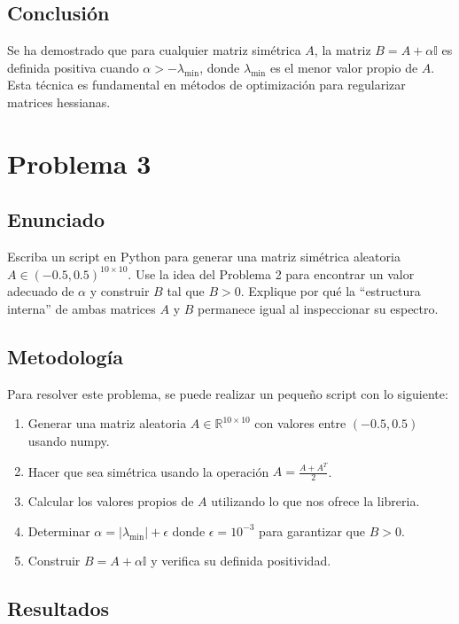 \documentclass{article}
\begin{document}
\subsection{Conclusión}

Se ha demostrado que para cualquier matriz simétrica $A$, la matriz $B = A + \alpha \mathbb{I}$ es definida positiva cuando $\alpha > -\lambda_{\min}$, donde $\lambda_{\min}$ es el menor valor propio de $A$. Esta técnica es fundamental en métodos de optimización para regularizar matrices hessianas.

\section{Problema 3}

\subsection{Enunciado}
Escriba un script en Python para generar una matriz simétrica aleatoria $A \in (-0.5, 0.5)^{10 \times 10}$. Use la idea del Problema 2 para encontrar un valor adecuado de $\alpha$ y construir $B$ tal que $B > 0$. Explique por qué la ``estructura interna'' de ambas matrices $A$ y $B$ permanece igual al inspeccionar su espectro.

\subsection{Metodología}

Para resolver este problema, se puede realizar un pequeño script con lo siguiente:
\begin{enumerate}
    \item Generar una matriz aleatoria $A \in \mathbb{R}^{10 \times 10}$ con valores entre $(-0.5, 0.5)$ usando numpy.
    \item Hacer que sea simétrica usando la operación $A = \frac{A + A^T}{2}$.
    \item Calcular los valores propios de $A$ utilizando lo que nos ofrece la libreria.
    \item Determinar $\alpha = |\lambda_{\min}| + \epsilon$ donde $\epsilon = 10^{-3}$ para garantizar que $B > 0$.
    \item Construir $B = A + \alpha \mathbb{I}$ y verifica su definida positividad.
\end{enumerate}

\subsection{Resultados}
\setcounter{equation}{0}
\end{document}
